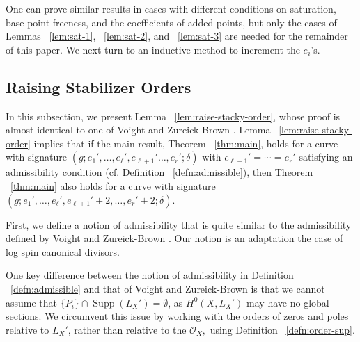 \documentclass{amsart}
\theoremstyle{plain}
\theoremstyle{definition}
\theoremstyle{remark}
\numberwithin{equation}{section}
\newcommand\ssec{\subsection}
\newcommand\sco{{\mathscr O}}
\newcommand{\halfcan}{L}
\DeclareMathOperator{\Supp}{Supp}
\begin{document}
One can prove similar results in cases with different conditions on saturation, base-point freeness, and the coefficients of added points, but only the cases of Lemmas ~\ref{lem:sat-1}, ~\ref{lem:sat-2}, and ~\ref{lem:sat-3} are needed for the remainder of this paper.  We next turn to an inductive method to increment the $e_i$'s.

\ssec{Raising Stabilizer Orders}
\label{ssec:raise-orders}
In this subsection, we present Lemma ~\ref{lem:raise-stacky-order},
whose proof is almost identical to one of Voight and Zureick-Brown
\cite[Theorem 8.5.7]{vzb:stacky}. Lemma
~\ref{lem:raise-stacky-order} implies that if the main result,
Theorem ~\ref{thm:main}, holds for a curve with signature $(g; e_1',
\ldots, e_\ell', e_{\ell + 1}' \ldots, e_r';\delta)$ with $e_{\ell + 1}' =
\cdots = e_r'$ satisfying an admissibility condition (cf. Definition
~\ref{defn:admissible}), then Theorem ~\ref{thm:main} also holds for
a curve with signature $(g; e_1', \ldots, e_\ell', e_{\ell + 1}' + 2,
\ldots, e_r' + 2; \delta)$.

First, we define a notion of admissibility that is quite similar to
the admissibility defined by Voight and Zureick-Brown
\cite[Definition 8.5.1]{vzb:stacky}. Our notion is an adaptation
the case of log spin canonical divisors.

One key difference between the notion of admissibility in Definition ~\ref{defn:admissible} and that of Voight and Zureick-Brown \cite[Definition 8.5.1]{vzb:stacky} is that
we cannot assume that $\{P_i\} \cap \Supp(\halfcan_X') = \emptyset$, as $H^0(X, \halfcan_X')$ may have no global sections. We circumvent this issue by working with the orders of zeros and poles relative to $\halfcan_X'$, rather than relative to the $\sco_X,$ using Definition ~\ref{defn:order-sup}.
\end{document}
